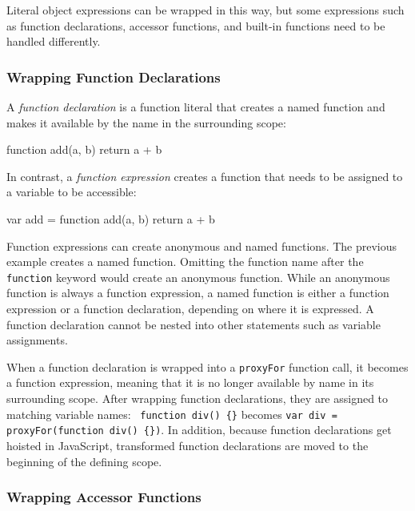 Literal object expressions can be wrapped in this way, but some expressions such as function declarations, accessor functions, and built-in functions need to be handled differently.

\subsubsection{Wrapping Function Declarations}

A \emph{function declaration} is a function literal that creates a named function and makes it available by the name in the surrounding scope:
\begin{code}
function add(a, b) { return a + b }
\end{code}

In contrast, a \emph{function expression} creates a function that needs to be assigned to a variable to be accessible:
\begin{code}
var add = function add(a, b) { return a + b }
\end{code}

Function expressions can create anonymous and named functions.
The previous example creates a named function.
Omitting the function name after the \lstinline{function} keyword would create an anonymous function.
While an anonymous function is always a function expression, a named function is either a function expression or a function declaration, depending on where it is expressed.
A function declaration cannot be nested into other statements such as variable assignments.

\begin{sloppypar} %
When a function declaration is wrapped into a \lstinline{proxyFor} function call, it becomes a function expression, meaning that it is no longer available by name in its surrounding scope.
After wrapping function declarations, they are assigned to matching variable names:~
\lstinline|function div() {}| becomes \lstinline|var div = proxyFor(function div() {})|.
In addition, because function declarations get hoisted in JavaScript, transformed function declarations are moved to the beginning of the defining scope.
\end{sloppypar}

\subsubsection{Wrapping Accessor Functions}

